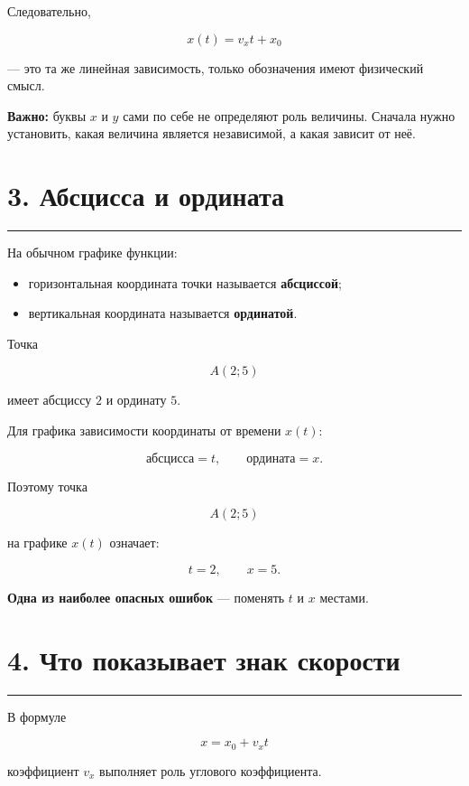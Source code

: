 \documentclass[a4paper,12pt]{article}
\newcommand{\sectionline}{%
  \par\noindent\color{accent}\rule{\linewidth}{0.5pt}\color{textgray}\par
}
\newcommand{\important}[1]{\textbf{\color{darkaccent}#1}}
\begin{document}
Следовательно,

\[
\boxed{x(t)=v_xt+x_0}
\]

--- это та же линейная зависимость, только обозначения имеют физический смысл.

\important{Важно:} буквы \(x\) и \(y\) сами по себе не определяют роль величины.
Сначала нужно установить, какая величина является независимой, а какая зависит от неё.


\section{\color{darkaccent}3. Абсцисса и ордината}
\sectionline

На обычном графике функции:

\begin{itemize}[leftmargin=*,itemsep=0.25em]
    \item горизонтальная координата точки называется \important{абсциссой};
    \item вертикальная координата называется \important{ординатой}.
\end{itemize}

Точка

\[
A(2;5)
\]

имеет абсциссу \(2\) и ординату \(5\).

Для графика зависимости координаты от времени \(x(t)\):

\[
\boxed{\text{абсцисса}=t,\qquad \text{ордината}=x}.
\]

Поэтому точка

\[
A(2;5)
\]

на графике \(x(t)\) означает:

\[
t=2,\qquad x=5.
\]

\important{Одна из наиболее опасных ошибок} --- поменять \(t\) и \(x\) местами.


\section{\color{darkaccent}4. Что показывает знак скорости}
\sectionline

В формуле

\[
x=x_0+v_xt
\]

коэффициент \(v_x\) выполняет роль углового коэффициента.
\end{document}
